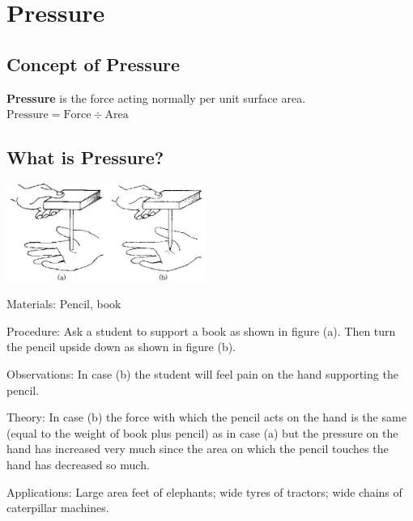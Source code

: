 \section{Pressure}
\label{sec:pressure}

\begin{multicols}{2}


\section*{Concept of Pressure}
\textbf{Pressure} is the force acting normally per unit surface area. \\
$\text{Pressure} = \text{Force} \div \text{Area} $


\subsection{What is Pressure?}

\begin{center}
\includegraphics[width=0.49\textwidth]{./img/source/pressure.jpg}
\end{center}

\begin{description*}
\item[Materials:]{Pencil, book}
\item[Procedure:]{Ask a student to support a book as shown in figure (a). Then turn the pencil upside down
as shown in figure (b).}
\item[Observations:]{In case (b) the student will feel pain on the hand supporting the pencil.}
\item[Theory:]{In case (b) the force with which the pencil acts on the hand is the same (equal to the
weight of book plus pencil) as in case (a) but the pressure on the hand has increased very
much since the area on which the pencil touches the hand has decreased so much.}
\item[Applications:]{Large area feet of elephants; wide tyres of tractors; wide chains of caterpillar machines.}
\end{description*}



\end{multicols}
